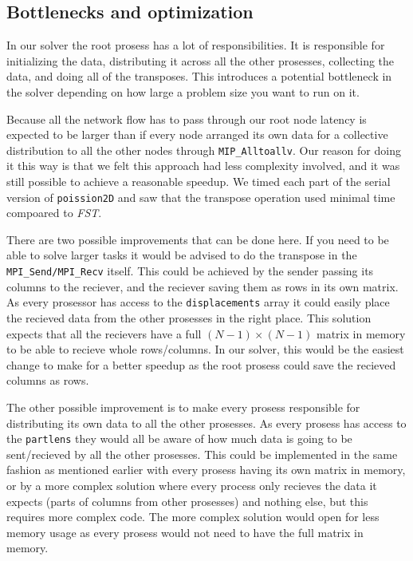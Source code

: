 
\subsection{Bottlenecks and optimization} %
\label{sub:bottlenecks_and_optimization}

In our solver the root prosess has a lot of responsibilities. It is responsible for initializing the data, distributing it across all the other prosesses, collecting the data, and doing all of the transposes. This introduces a potential bottleneck in the solver depending on how large a problem size you want to run on it. 

Because all the network flow has to pass through our root node latency is expected to be larger than if every node arranged its own data for a collective distribution to all the other nodes through \texttt{MIP_Alltoallv}. Our reason for doing it this way is that we felt this approach had less complexity involved, and it was still possible to achieve a reasonable speedup. We timed each part of the serial version of \texttt{poission2D} and saw that the transpose operation used minimal time compoared to \emph{FST}. 

There are two possible improvements that can be done here. If you need to be able to solve larger tasks it would be advised to do the transpose in the \texttt{MPI_Send/MPI_Recv} itself. This could be achieved by the sender passing its columns to the reciever, and the reciever saving them as rows in its own matrix. As every prosessor has access to the \texttt{displacements} array it could easily place the recieved data from the other prosesses in the right place. This solution expects that all the recievers have a full $(N-1)\times(N-1)$ matrix in memory to be able to recieve whole rows/columns. In our solver, this would be the easiest change to make for a better speedup as the root prosess could save the recieved columns as rows. 

The other possible improvement is to make every prosess responsible for distributing its own data to all the other prosesses. As every prosess has access to the \texttt{partlens} they would all be aware of how much data is going to be sent/recieved by all the other prosesses. This could be implemented in the same fashion as mentioned earlier with every prosess having its own matrix in memory, or by a more complex solution where every process only recieves the data it expects (parts of columns from other prosesses) and nothing else, but this requires more complex code. The more complex solution would open for less memory usage as every prosess would not need to have the full matrix in memory. 

